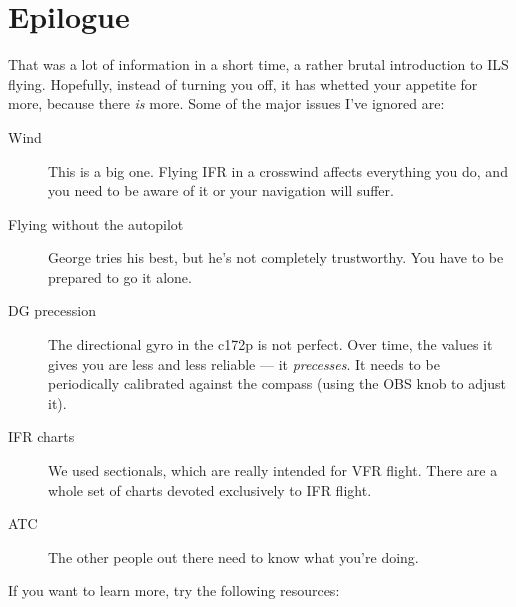 
\section{Epilogue}


That was a lot of information in a short time, a rather brutal
introduction to ILS flying.  Hopefully, instead of turning you off, it
has whetted your appetite for more, because there \emph{is} more.
Some of the major issues I've ignored are:

\begin{description}
\item[Wind] This is a big one.  Flying IFR in a crosswind affects
  everything you do, and you need to be aware of it or your navigation
  will suffer.
\item[Flying without the autopilot] George tries his best, but he's
  not completely trustworthy.  You have to be prepared to go it
  alone.
\item[DG precession] The directional gyro in the c172p is not perfect.
  Over time, the values it gives you are less and less reliable --- it
  \emph{precesses}.  It needs to be periodically calibrated against
  the compass (using the OBS knob to adjust it).
\item[IFR charts] We used sectionals, which are really intended for
  VFR flight.  There are a whole set of charts devoted exclusively to
  IFR flight.
\item[ATC] The other people out there need to know what you're doing.
\end{description}

If you want to learn more, try the following resources:

